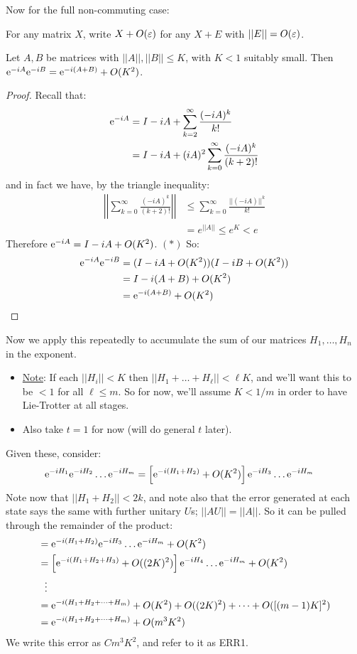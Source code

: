 \documentclass[]{article}
\begin{document}
Now for the full non-commuting case:

\begin{remark*}[Notation]
	For any matrix $X$, write $X + O(\varepsilon)$ for any $X + E$ with $||E|| = O(\varepsilon)$.
\end{remark*}

\begin{thmenv*}
	Let $A,B$ be matrices with $||A||,||B|| \le K$, with $K < 1$ suitably small. Then $\mathrm{e}^{-iA}\mathrm{e}^{-iB} = \mathrm{e}^{-i(A+B)} + O(K^2)$.
\end{thmenv*}
\begin{proof}
	Recall that:
	\begin{align*}
		\mathrm{e}^{-iA} &= I - iA + \sum_{k=2}^{\infty}\frac{(-iA)^k}{k!}\\
		&= I - iA + (iA)^2\sum_{k=0}^{\infty}\frac{(-iA)^k}{(k+2)!}
	\end{align*}
	and in fact we have, by the triangle inequality:
	\begin{align*}
		\left|\left|\sum_{k=0}^{\infty}\frac{(-iA)^k}{(k+2)!}\right|\right| & \le \sum_{k=0}^{\infty}\frac{||(-iA)||^k}{k!}\\
		&= e^{||A||} \le e^K < e
	\end{align*}
	Therefore $\mathrm{e}^{-iA} = I - iA + O(K^2)$. $(\ast)$ So:
	\begin{align*}
		\mathrm{e}^{-iA}\mathrm{e}^{-iB} &= (I - iA + O(K^2))(I - iB + O(K^2))\\
		&= I - i(A+B) + O(K^2)\\
		&= \mathrm{e}^{-i(A+B)} + O(K^2)
	\end{align*}
\end{proof}
	Now we apply this repeatedly to accumulate the sum of our matrices $H_1,\dots,H_n$ in the exponent.
\begin{itemize}
	\item \underline{Note}: If each $||H_i|| < K$ then $||H_1 + \dots + H_\ell|| < \ell K$, and we'll want this to be $<1$ for all $\ell \le m$. So for now, we'll assume $K < 1/m$ in order to have Lie-Trotter at all stages.
	\item Also take $t = 1$ for now (will do general $t$ later).
\end{itemize}

Given these, consider:
\begin{align*}
	\mathrm{e}^{-iH_1}\mathrm{e}^{-iH_2}\dots\mathrm{e}^{-iH_m} &= \left[ \mathrm{e}^{-i(H_1+H_2)} + O(K^2)\right] \mathrm{e}^{-iH_3}\dots \mathrm{e}^{-iH_m}
\end{align*}
Note now that $||H_1 + H_2|| < 2k$, and note also that the error generated at each state says the same with further unitary $U$s; $||AU|| = ||A||$. So it can be pulled through the remainder of the product:
\begin{align*}
	&= \mathrm{e}^{-i(H_1+H_2)}\mathrm{e}^{-iH_3}\dots\mathrm{e}^{-iH_m}+O(K^2)\\
	&= \left[\mathrm{e}^{-i(H_1+H_2+H_3)} + O((2K)^2)\right]\mathrm{e}^{-iH_4}\dots\mathrm{e}^{-iH_m}+O(K^2)\\
	&\ \ \vdots\\
	&= \mathrm{e}^{-i(H_1+H_2+\dots+H_m)}+O(K^2) + O((2K)^2) + \dots + O([(m-1)K]^2)\\
	&= \mathrm{e}^{-i(H_1 + H_2 +\dots + H_m)} + O(m^3K^2)
\end{align*}
We write this error as $Cm^3K^2$, and refer to it as ERR1.
\end{document}
